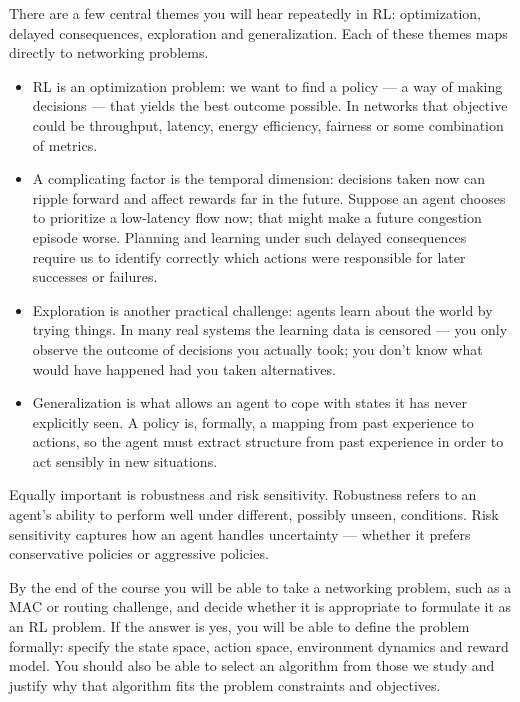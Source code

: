 There are a few central themes you will hear repeatedly in RL: optimization, delayed consequences, exploration and generalization. Each of these themes maps directly to networking problems.
\begin{itemize}
    \item RL is an optimization problem: we want to find a policy — a way of making decisions — that yields the best outcome possible. In networks that objective could be throughput, latency, energy efficiency, fairness or some combination of metrics.
    \item A complicating factor is the temporal dimension: decisions taken now can ripple forward and affect rewards far in the future. Suppose an agent chooses to prioritize a low-latency flow now; that might make a future congestion episode worse. Planning and learning under such delayed consequences require us to identify correctly which actions were responsible for later successes or failures.
    \item Exploration is another practical challenge: agents learn about the world by trying things. In many real systems the learning data is censored — you only observe the outcome of decisions you actually took; you don't know what would have happened had you taken alternatives.
    \item Generalization is what allows an agent to cope with states it has never explicitly seen. A policy is, formally, a mapping from past experience to actions, so the agent must extract structure from past experience in order to act sensibly in new situations.
\end{itemize}
Equally important is robustness and risk sensitivity. Robustness refers to an agent’s ability to perform well under different, possibly unseen, conditions. Risk sensitivity captures how an agent handles uncertainty — whether it prefers conservative policies or aggressive policies.

By the end of the course you will be able to take a networking problem, such as a MAC or routing challenge, and decide whether it is appropriate to formulate it as an RL problem. If the answer is yes, you will be able to define the problem formally: specify the state space, action space, environment dynamics and reward model. You should also be able to select an algorithm from those we study and justify why that algorithm fits the problem constraints and objectives.